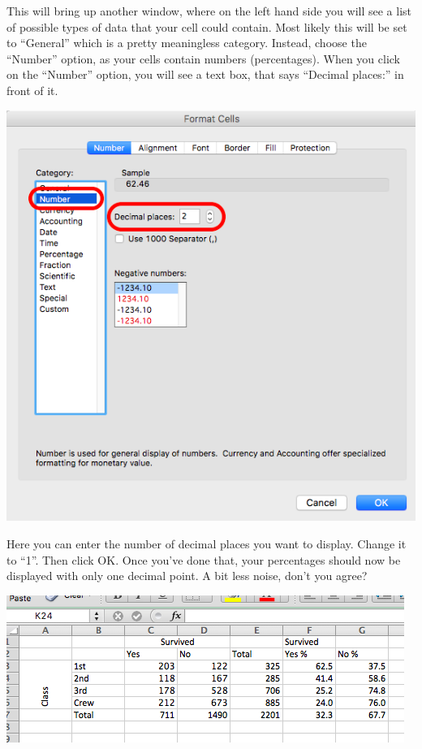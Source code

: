 \documentclass[]{book}
\theoremstyle{definition}
\theoremstyle{definition}
\theoremstyle{definition}
\theoremstyle{remark}
\begin{document}
This will bring up another window, where on the left hand side you will
see a list of possible types of data that your cell could contain. Most
likely this will be set to ``General'' which is a pretty meaningless
category. Instead, choose the ``Number'' option, as your cells contain
numbers (percentages). When you click on the ``Number'' option, you will
see a text box, that says ``Decimal places:'' in front of it.

\includegraphics{imgs/num_dec_set.png}

Here you can enter the number of decimal places you want to display.
Change it to ``1''. Then click OK. Once you've done that, your
percentages should now be displayed with only one decimal point. A bit
less noise, don't you agree?

\includegraphics{imgs/one_dec_row_perc.png}
\end{document}
